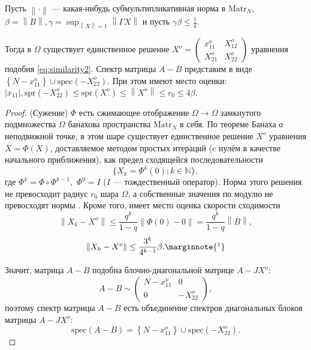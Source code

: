 \begin{lemma}
    Пусть \( {\left\|\cdot\right\|} \) --- какая-нибудь субмультипликативная норма в \( \mathrm{Matr}_{N} \),
    \( \beta={\left\|B\right\|}, \gamma=\sup_{{\left\|X\right\|}=1}{\left\|\Gamma X\right\|} \)
    и пусть
    \( \gamma\beta\leq\frac14. \)

    Тогда в \( \Omega \) существует единственное решение
    \( X^o = \begin{pmatrix}
        x_{11}^o & X_{12}^o \\
        X_{21}^o & X_{22}^o
    \end{pmatrix}\) уравнения подобия
    \eqref{eq:similarity2}.
    Спектр матрицы \( A - B \) представим в виде
    \( \left\{ N - x_{11}^o \right\} \cup \mathrm{spec}\left({-X_{22}^o}\right) \).
    При этом имеют место оценки:
    \( \lvert x_{11} \rvert, \mathrm{spr}\left({-X_{22}^o}\right) \leq \mathrm{spr}\left({X^o}\right)
    \leq {\left\|X^o\right\|} \leq r_0 \leq 4\beta.
        \)
\end{lemma}
\begin{proof}
    (Сужение) \( \Phi \) есть сжимающее отображение \( \Omega\to\Omega \)
    замкнутого подмножества \( \Omega \)
    банахова пространства \( \mathrm{Matr}_{N} \) в себя.
    По теореме Банаха о неподвижной точке, в этом шаре существует единственное решение \( X^o \)
    уравнения \( X = \Phi (X) \),
    доставляемое методом простых итераций (c нулём в качестве начального приближения),
    как предел сходящейся последовательности
    \[
        \{X_k = \Phi^k(0); k\in\mathbb{N}\},
        \]
    где \( \Phi^k = \Phi \circ \Phi^{k-1}, \)
    \( \Phi^0 = I \) (\( I \) --- тождественный оператор).
    Норма этого решения не превосходит радиус \( r_0 \) шара \( \Omega \),
    а собственные значения по модулю не превосходят нормы \cite{baskakov-harmonic}.
    Кроме того, имеет место оценка скорости сходимости
    \[
        {\left\|X_k - X^o\right\|} \leq \frac{q^k}{1-q} {\left\|\Phi(0) - 0\right\|} = \frac{q^k}{1-q}{\left\|B\right\|},
        \]
    \[
        {\left\|X_k - X^o\right\|} \leq \frac{3^k}{4^{k-1}}\beta.\marginnote{\footnotemark}
        \]

    Значит, матрица \( A-B \) подобна блочно-диагональной матрице \( A - JX^o \):
    \[
        A-B \sim
    \begin{pmatrix}
        N - x_{11}^o & 0 \\
        0            & -X_{22}^o
    \end{pmatrix},
    \]
    поэтому спектр матрицы \( A - B \) есть объединение спектров
    диагональных блоков матрицы \( A - JX^o \):
    \[ \mathrm{spec}\left({A-B}\right) = \left\{N - x_{11}^o\right\} \cup \mathrm{spec}\left({-X_{22}^o}\right). \]
\end{proof}
